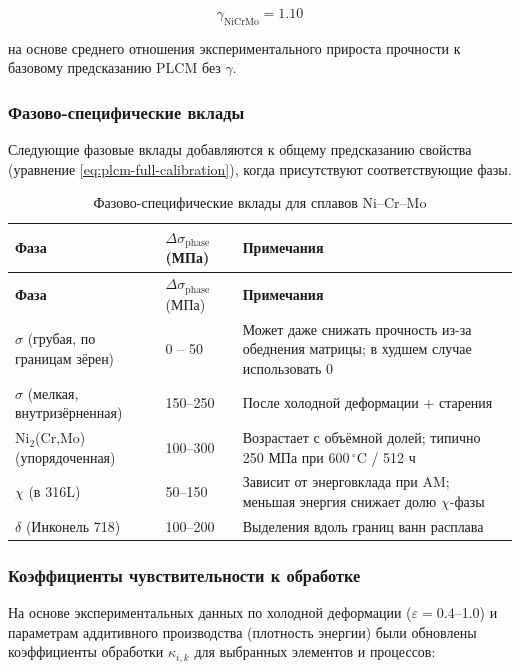 \documentclass[12pt,a4paper]{article}
\begin{document}
	\[
	\gamma_{\text{NiCrMo}} = 1.10
	\]
	
	на основе среднего отношения экспериментального прироста прочности к базовому предсказанию PLCM без $\gamma$.
	
	\subsubsection{Фазово-специфические вклады}
	Следующие фазовые вклады добавляются к общему предсказанию свойства (уравнение \ref{eq:plcm-full-calibration}), когда присутствуют соответствующие фазы.
	
	\begin{longtable}{p{3.5cm} p{3.0cm} p{4.0cm}}
		\caption{Фазово-специфические вклады для сплавов Ni–Cr–Mo}\label{tab:nicrmo_phase_contrib}\\
		\toprule
		\textbf{Фаза} & \(\Delta\sigma_{\text{phase}}\) (МПа) & \textbf{Примечания} \\
		\midrule
		\endfirsthead
		\toprule
		\textbf{Фаза} & \(\Delta\sigma_{\text{phase}}\) (МПа) & \textbf{Примечания} \\
		\midrule
		\endhead
		\(\sigma\) (грубая, по границам зёрен) & 0 – 50 & Может даже снижать прочность из-за обеднения матрицы; в худшем случае использовать 0 \\
		\(\sigma\) (мелкая, внутризёрненная) & 150–250 & После холодной деформации + старения \\
		Ni$_2$(Cr,Mo) (упорядоченная) & 100–300 & Возрастает с объёмной долей; типично 250 МПа при 600\,\(^{\circ}\)C / 512 ч \\
		\(\chi\) (в 316L) & 50–150 & Зависит от энерговклада при AM; меньшая энергия снижает долю $\chi$-фазы \\
		\(\delta\) (Инконель 718) & 100–200 & Выделения вдоль границ ванн расплава \\
		\bottomrule
	\end{longtable}
	
	\subsubsection{Коэффициенты чувствительности к обработке}
	На основе экспериментальных данных по холодной деформации ($\varepsilon=0.4$–1.0) и параметрам аддитивного производства (плотность энергии) были обновлены коэффициенты обработки $\kappa_{i,k}$ для выбранных элементов и процессов:
	
\end{document}
